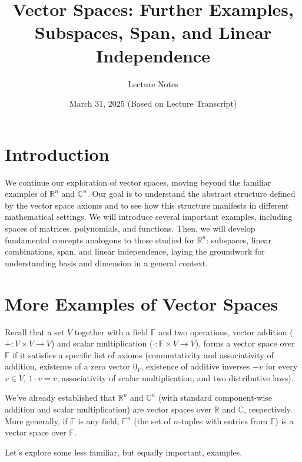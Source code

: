 \documentclass[11pt]{article}
\title{Vector Spaces: Further Examples, Subspaces, Span, and Linear Independence}
\author{Lecture Notes}
\date{March 31, 2025 (Based on Lecture Transcript)}
\theoremstyle{definition}
\newcommand{\F}{\mathbb{F}}
\newcommand{\R}{\mathbb{R}}
\newcommand{\C}{\mathbb{C}}
\begin{document}
\maketitle

\section{Introduction}
We continue our exploration of vector spaces, moving beyond the familiar examples of $\R^n$ and $\C^n$. Our goal is to understand the abstract structure defined by the vector space axioms and to see how this structure manifests in different mathematical settings. We will introduce several important examples, including spaces of matrices, polynomials, and functions. Then, we will develop fundamental concepts analogous to those studied for $\R^n$: subspaces, linear combinations, span, and linear independence, laying the groundwork for understanding basis and dimension in a general context.

\section{More Examples of Vector Spaces}

Recall that a set $V$ together with a field $\F$ and two operations, vector addition ($+: V \times V \to V$) and scalar multiplication ($\cdot: \F \times V \to V$), forms a vector space over $\F$ if it satisfies a specific list of axioms (commutativity and associativity of addition, existence of a zero vector $0_V$, existence of additive inverses $-v$ for every $v \in V$, $1 \cdot v = v$, associativity of scalar multiplication, and two distributive laws).

We've already established that $\R^n$ and $\C^n$ (with standard component-wise addition and scalar multiplication) are vector spaces over $\R$ and $\C$, respectively. More generally, if $\F$ is any field, $\F^n$ (the set of $n$-tuples with entries from $\F$) is a vector space over $\F$.

Let's explore some less familiar, but equally important, examples.
\end{document}
